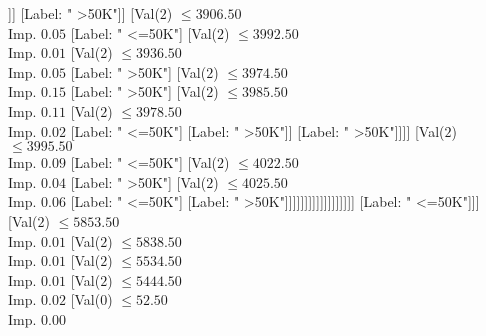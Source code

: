 \documentclass[margin=10pt]{standalone}
\begin{document}
\begin{forest}
																																[Val($2$) $ \leq 3784.50$ \\ Imp. $0.13$
																																	[Val($2$) $ \leq 3767.50$ \\ Imp. $0.02$
																																		[Label: " <=50K"]
																																		[Val($2$) $ \leq 3775.50$ \\ Imp. $0.25$
																																			[Label: " <=50K"]
																																			[Label: " >50K"]]]
																																	[Label: " >50K"]]
																																[Val($2$) $ \leq 3906.50$ \\ Imp. $0.05$
																																	[Label: " <=50K"]
																																	[Val($2$) $ \leq 3992.50$ \\ Imp. $0.01$
																																		[Val($2$) $ \leq 3936.50$ \\ Imp. $0.05$
																																			[Label: " >50K"]
																																			[Val($2$) $ \leq 3974.50$ \\ Imp. $0.15$
																																				[Label: " >50K"]
																																				[Val($2$) $ \leq 3985.50$ \\ Imp. $0.11$
																																					[Val($2$) $ \leq 3978.50$ \\ Imp. $0.02$
																																						[Label: " <=50K"]
																																						[Label: " >50K"]]
																																					[Label: " >50K"]]]]
																																		[Val($2$) $ \leq 3995.50$ \\ Imp. $0.09$
																																			[Label: " <=50K"]
																																			[Val($2$) $ \leq 4022.50$ \\ Imp. $0.04$
																																				[Label: " >50K"]
																																				[Val($2$) $ \leq 4025.50$ \\ Imp. $0.06$
																																					[Label: " <=50K"]
																																					[Label: " >50K"]]]]]]]]]]]]]]]]]]
																				[Label: " <=50K"]]]
																		[Val($2$) $ \leq 5853.50$ \\ Imp. $0.01$
																			[Val($2$) $ \leq 5838.50$ \\ Imp. $0.01$
																				[Val($2$) $ \leq 5534.50$ \\ Imp. $0.01$
																					[Val($2$) $ \leq 5444.50$ \\ Imp. $0.02$
																						[Val($0$) $ \leq 52.50$ \\ Imp. $0.00$

\end{forest}
\end{document}
